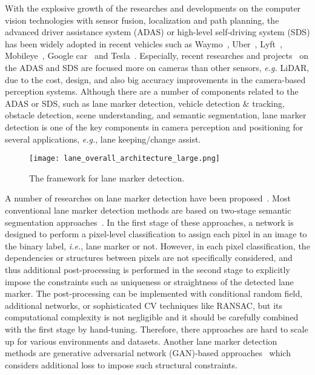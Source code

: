 \documentclass[10pt,twocolumn,letterpaper]{article}
\begin{document}
With the explosive growth of the researches and developments on the computer vision technologies with sensor fusion, localization and path planning, the advanced driver assistance system (ADAS) or high-level self-driving system (SDS) has been widely adopted in recent vehicles such as Waymo~\cite{rosenband2017inside}, Uber~\cite{uber-self-driving}, Lyft~\cite{lyft-self-driving}, Mobileye~\cite{yoffie2014mobileye}, Google car~\cite{poczter2014google} and Tesla~\cite{dikmen2016autonomous}. Especially, recent researches and projects~\cite{garnett2017real, dikmen2016autonomous, yoffie2014mobileye} on the ADAS and SDS are focused more on cameras than other sensors, \textit{e.g.} LiDAR, due to the cost, design, and also big accuracy improvements in the camera-based perception systems. Although there are a number of components related to the ADAS or SDS, such as lane marker detection, vehicle detection \& tracking, obstacle detection, scene understanding, and semantic segmentation, lane marker detection is one of the key components in camera perception and positioning for several applications, \textit{e.g.}, lane keeping/change assist.


\begin{figure}[t]
\centering
\texttt{[image: lane\_overall\_architecture\_large.png]}
\caption{The \textbf{\algorithmname} framework for lane marker detection.}
\label{fig:arch_overview}
\end{figure}



A number of researches on lane marker detection have been proposed~\cite{SpatialAsDeep, SAD, LaneGan, Drivable, StixelNet, ElGAN, IV_Instance, ENet, ERFNet, Fitting, MultiRegress, VPG, Clustering}. Most conventional lane marker detection methods are based on two-stage semantic segmentation approaches~\cite{neven2018towards, krahenbuhl2011efficient, hillel2014recent}. In the first stage of these approaches, a network is designed to perform a pixel-level classification to assign each pixel in an image to the binary label, \textit{i.e.}, lane marker or not. However, in each pixel classification, the dependencies or structures between pixels are not specifically considered, and thus additional post-processing is performed in the second stage to explicitly impose the constraints such as uniqueness or straightness of the detected lane marker. The post-processing can be implemented with conditional random field, additional networks, or sophisticated CV techniques like RANSAC, but its computational complexity is not negligible and it should be carefully combined with the first stage by hand-tuning. Therefore, there approaches are hard to scale up for various environments and datasets. Another lane marker detection methods are generative adversarial network (GAN)-based approaches~\cite{LaneGan, ElGAN, luc2016semantic} which considers additional loss to impose such structural constraints.
\end{document}
